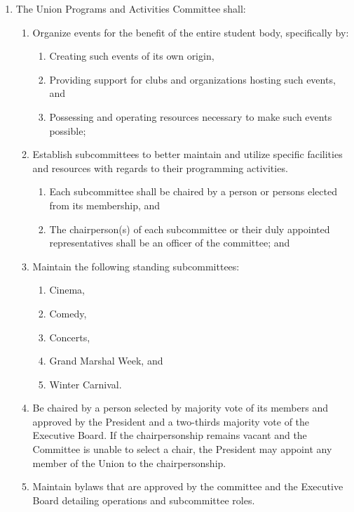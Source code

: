 \documentclass{uniondoc}
\begin{document}
\begin{enumerate}
\begin{enumerate}
\begin{enumerate}
    \item Maintain bylaws detailing operations and the roles of any subcommittees that are subsidiary to these Bylaws and are approved by the Council and the Executive Board.
    \end{enumerate}
  \end{enumerate}
\item The Union Programs and Activities Committee shall:
  \begin{enumerate}
  \item Organize events for the benefit of the entire student body, specifically by:
    \begin{enumerate}
    \item Creating such events of its own origin,
    \item Providing support for clubs and organizations hosting such events, and
    \item Possessing and operating resources necessary to make such events possible;
    \end{enumerate}
  \item Establish subcommittees to better maintain and utilize specific facilities and resources with regards to their programming activities.
    \begin{enumerate}
    \item Each subcommittee shall be chaired by a person or persons elected from its membership, and
    \item The chairperson(s) of each subcommittee or their duly appointed representatives shall be an officer of the committee; and
    \end{enumerate}
  \item Maintain the following standing subcommittees:
    \begin{enumerate}
    \item Cinema,
    \item Comedy,
    \item Concerts,
    \item Grand Marshal Week, and
    \item Winter Carnival.
    \end{enumerate}
  \item Be chaired by a person selected by majority vote of its members and approved by the President and a two-thirds majority vote of the Executive Board. If the chairpersonship remains vacant and the Committee is unable to select a chair, the President may appoint any member of the Union to the chairpersonship.
  \item Maintain bylaws that are approved by the committee and the Executive Board detailing operations and subcommittee roles.

\end{enumerate}
\end{enumerate}
\end{document}
